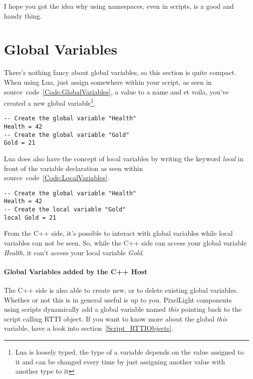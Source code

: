 I hope you got the idea why using namespaces, even in scripts, is a good and handy thing.




\section{Global Variables}
\label{Script_GlobalVariables}
There's nothing fancy about global variables, so this section is quite compact. When using Lua, just assign somewhere within your script, as seen in source~code~\ref{Code:GlobalVariables}, a value to a name and et voila, you've created a new global variable\footnote{Lua is loosely typed, the type of a variable depends on the value assigned to it and can be changed every time by just assigning another value with another type to it}.
\begin{lstlisting}[float=htb,label=Code:GlobalVariables,caption={Global variables}]
-- Create the global variable "Health"
Health = 42
-- Create the global variable "Gold"
Gold = 21
\end{lstlisting}

Lua does also have the concept of local variables by writing the keyword \emph{local} in front of the variable declaration as seen within source~code~\ref{Code:LocalVariables}.
\begin{lstlisting}[float=htb,label=Code:LocalVariables,caption={Local variables}]
-- Create the global variable "Health"
Health = 42
-- Create the local variable "Gold"
local Gold = 21
\end{lstlisting}
From the C++ side, it's possible to interact with global variables while local variables can not be seen. So, while the C++ side can access your global variable \emph{Health}, it can't access your local variable \emph{Gold}.


\paragraph{Global Variables added by the C++ Host}
The C++ side is also able to create new, or to delete existing global variables. Whether or not this is in general useful is up to you. PixelLight components using scripts dynamically add a global variable named \emph{this} pointing back to the script calling \ac{RTTI} object. If you want to know more about the global \emph{this} variable, have a look into section~\ref{Script_RTTIObjects}.





